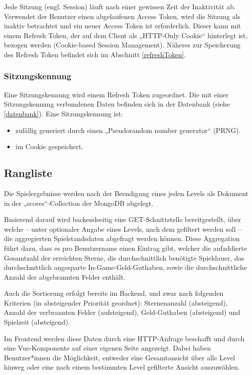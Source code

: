 \documentclass[letterpaper, 10 pt, conference]{ieeeconf}
\begin{document}
Jede Sitzung (engl. Session) läuft nach einer gewissen Zeit der Inaktivität ab. 
Verwendet der Benutzer einen abgelaufenen Access Token, wird die Sitzung als inaktiv betrachtet und ein neuer Access Token ist erforderlich.  Dieser kann mit einem Refresh Token, der auf dem Client als „HTTP-Only Cookie“ hinterlegt ist, bezogen werden (Cookie-based Session Management). Näheres zur Speicherung des Refresh Token befindet sich im Abschnitt \ref{refreshToken}.

\subsubsection{Sitzungskennung}

Eine Sitzungskennung wird einem Refresh Token zugeordnet. Die mit einer Sitzungskennung verbundenen Daten befinden sich in der Datenbank (siehe \ref{datenbank}). Eine Sitzungskennung ist:

\begin{itemize}
\item zufällig generiert durch einen „Pseudorandom number generator“ (PRNG).
\item im Cookie gespeichert.
\end{itemize}

\subsection{Rangliste}

Die Spielergebnisse werden nach der Beendigung eines jeden Levels als Dokument in der „scores“-Collection der MongoDB abgelegt.

Basierend darauf wird backendseitig eine GET-Schnittstelle bereitgestellt,
über welche – unter optionaler Angabe eines Levels, nach dem gefiltert werden soll – die aggregierten Spielstandsdaten abgefragt werden können.
Diese Aggregation führt dazu, dass es pro Benutzername einen Eintrag gibt, welcher die aufaddierte Gesamtzahl der erreichten Sterne,
die durchschnittlich benötigte Spieldauer, das durchschnittlich angesparte In-Game-Geld-Guthaben, sowie die durchschnittliche Anzahl der abgebrannten Felder enthält.

Auch die Sortierung erfolgt bereits im Backend, und zwar nach folgenden Kriterien (in absteigender Priorität geordnet):
Sternenanzahl (absteigend), Anzahl der verbrannten Felder (aufsteigend), Geld-Guthaben (absteigend) und Spielzeit (absteigend).

Im Frontend werden diese Daten durch eine HTTP-Anfrage beschafft und durch eine Vue-Komponente auf einer eigenen Seite angezeigt.
Dabei haben Benutzer*innen die Möglichkeit, entweder eine Gesamtansicht über alle Level hinweg oder eine nach einem bestimmten Level gefilterte Ansicht auszuwählen.
\end{document}
